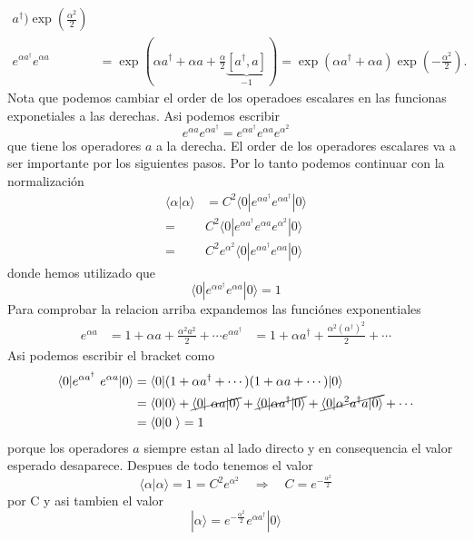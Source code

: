 \begin{solucion}
\begin{align*}
a^\dagger) \exp(\frac{\alpha^2}{2}) \\
	e^{\alpha a^\dagger} e^{\alpha a} &= \exp(\alpha a^\dagger + \alpha a +
\frac{\alpha}{2} \underbrace{[a^\dagger, a]}_{-1}) = \exp(\alpha a^\dagger +
\alpha a) \exp(-\frac{\alpha^2}{2}).
\end{align*}
Nota que podemos cambiar el order de los operadoes escalares en las funcionas
exponetiales a las derechas. Asi podemos escribir
$$
	e^{\alpha a} e^{\alpha a^\dagger} = e^{\alpha a^\dagger} e^{\alpha a}
e^{\alpha^2}
$$
que tiene los operadores $a$ a la derecha. El order de los operadores escalares
va a ser importante por los siguientes pasos. Por lo tanto podemos continuar con
la normalización
\begin{align*}
	\langle \alpha | \alpha \rangle &= C^2 \langle 0 | e^{\alpha a^\dagger}
e^{\alpha a^\dagger} | 0\rangle \\
	=& C^2 \langle 0 | e^{\alpha a^\dagger} e^{\alpha a} e^{\alpha^2} | 0\rangle
\\
	=& C^2 e^{\alpha^2} \langle 0| e^{\alpha a^\dagger} e^{\alpha a} | 0\rangle
\end{align*}
donde hemos utilizado que 
$$
	\langle 0 | e^{\alpha a^\dagger} e^{\alpha a} | 0\rangle = 1
$$
Para comprobar la relacion arriba expandemos las funciónes exponentiales
\begin{align*}
	e^{\alpha a} &= 1 + \alpha a + \frac{\alpha^2 a^2}{2} + \cdots 
	e^{\alpha a^\dagger} &= 1 + \alpha a^\dagger + \frac{\alpha^2
(\alpha^\dagger)^2}{2} + \cdots
\end{align*}
Asi podemos escribir el bracket como 
\begin{align*}
	\langle 0 | e^{\alpha a^\dagger} e^{\alpha a} | 0\rangle &= \langle 0 | ( 1 +
\alpha a^\dagger + \cdots)(1 + \alpha a + \cdots ) | 0 \rangle \\
	&= \langle 0 | 0 \rangle + \cancel{\langle 0 | \alpha a | 0 \rangle} +
\cancel{\langle 0 | \alpha a^\dagger | 0 \rangle} + \cancel{\langle 0 | \alpha^2
a^\dagger a | 0\rangle} + \cdots \\
	&= \langle 0 | 0 \rangle = 1 
\end{align*}
porque los operadores $a$ siempre estan al lado directo y en consequencia el
valor esperado desaparece. Despues de todo tenemos el valor
$$
	\langle \alpha | \alpha \rangle = 1 = C^2 e^{\alpha^2} \quad \Rightarrow
\quad C = e^{-\frac{\alpha^2}{2}}
$$
por C y asi tambien el valor
$$
	|\alpha \rangle = e^{-\frac{\alpha^2}{2}} e^{\alpha a^\dagger} | 0 \rangle
$$
\end{solucion}





